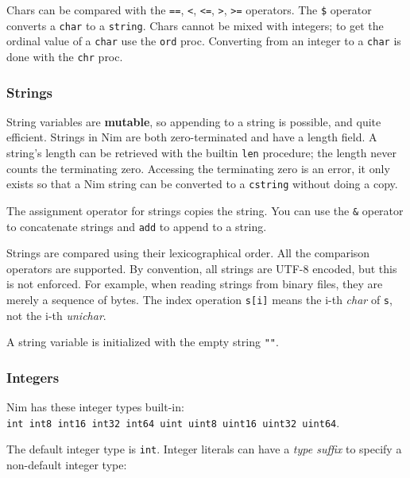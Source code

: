 Chars can be compared with the \texttt{==}, \texttt{\textless{}},
\texttt{\textless{}=}, \texttt{\textgreater{}}, \texttt{\textgreater{}=}
operators. The \texttt{\$} operator converts a \texttt{char} to a
\texttt{string}. Chars cannot be mixed with integers; to get the ordinal
value of a \texttt{char} use the \texttt{ord} proc. Converting from an
integer to a \texttt{char} is done with the \texttt{chr} proc.

\hypertarget{strings}{%
\subsubsection{Strings}\label{strings}}

String variables are \textbf{mutable}, so appending to a string is
possible, and quite efficient. Strings in Nim are both zero-terminated
and have a length field. A string's length can be retrieved with the
builtin \texttt{len} procedure; the length never counts the terminating
zero. Accessing the terminating zero is an error, it only exists so that
a Nim string can be converted to a \texttt{cstring} without doing a
copy.

The assignment operator for strings copies the string. You can use the
\texttt{\&} operator to concatenate strings and \texttt{add} to append
to a string.

Strings are compared using their lexicographical order. All the
comparison operators are supported. By convention, all strings are UTF-8
encoded, but this is not enforced. For example, when reading strings
from binary files, they are merely a sequence of bytes. The index
operation \texttt{s{[}i{]}} means the i-th \emph{char} of \texttt{s},
not the i-th \emph{unichar}.

A string variable is initialized with the empty string \texttt{""}.

\hypertarget{integers}{%
\subsubsection{Integers}\label{integers}}

Nim has these integer types built-in:
\texttt{int\ int8\ int16\ int32\ int64\ uint\ uint8\ uint16\ uint32\ uint64}.

The default integer type is \texttt{int}. Integer literals can have a
\emph{type suffix} to specify a non-default integer type:

\begin{verbatim}
\end{verbatim}

